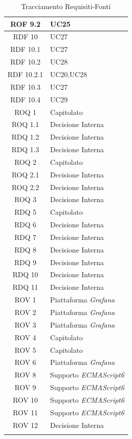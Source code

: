 \begin{center}
\begin{longtable}[c]{|c|m{}|}
\hline
ROF 9.2 & UC25 \\
\hline
\rowcolor{grigio}RDF 10 & UC27 \\
\hline
RDF 10.1 & UC27 \\
\hline
\rowcolor{grigio}RDF 10.2 & UC28 \\
\hline
RDF 10.2.1 & UC20,UC28 \\
\hline
\rowcolor{grigio}RDF 10.3 & UC27 \\
\hline
RDF 10.4 & UC29 \\
\hline
\rowcolor{grigio}ROQ 1 & Capitolato \\ 
\hline
ROQ 1.1 & Decisione Interna \\ 
\hline
\rowcolor{grigio}RDQ 1.2 & Decisione Interna \\ 
\hline
RDQ 1.3 & Decisione Interna \\ 
\hline
\rowcolor{grigio}ROQ 2 & Capitolato \\ 
\hline
ROQ 2.1 & Decisione Interna \\ 
\hline
\rowcolor{grigio}ROQ 2.2 & Decisione Interna \\ 
\hline
ROQ 3 & Decisione Interna \\ 
\hline
\rowcolor{grigio}RDQ 5 & Capitolato \\ 
\hline
RDQ 6 & Decisione Interna \\ 
\hline
\rowcolor{grigio}RDQ 7 & Decisione Interna \\ 
\hline
RDQ 8 & Decisione Interna \\ 
\hline
\rowcolor{grigio}RDQ 9 & Decisione Interna \\ 
\hline
RDQ 10 & Decisione Interna \\ 
\hline
\rowcolor{grigio}RDQ 11 & Decisione Interna \\ 
\hline
ROV 1 & Piattaforma \textit{Grafana} \\
\hline
\rowcolor{grigio}ROV 2 & Piattaforma \textit{Grafana} \\
\hline
ROV 3 & Piattaforma \textit{Grafana} \\
\hline
\rowcolor{grigio}ROV 4 & Capitolato \\ 
\hline
ROV 5 & Capitolato \\ 
\hline
\rowcolor{grigio}ROV 6 & Piattaforma \textit{Grafana} \\
\hline
ROV 8 & Supporto \textit{ECMAScript6} \\
\hline
\rowcolor{grigio}ROV 9 & Supporto \textit{ECMAScript6} \\
\hline
ROV 10 & Supporto \textit{ECMAScript6} \\
\hline
\rowcolor{grigio}ROV 11 & Supporto \textit{ECMAScript6} \\
\hline
ROV 12 & Decisione Interna \\ 
\hline
\caption{Tracciamento Requisiti-Fonti}
\end{longtable}
\end{center}





